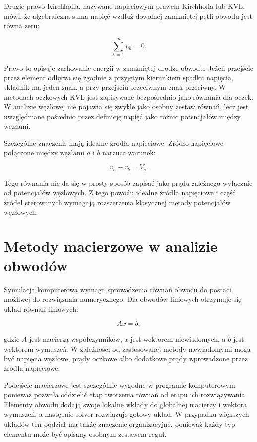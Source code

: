 Drugie prawo Kirchhoffa, nazywane napięciowym prawem Kirchhoffa lub KVL, mówi, że algebraiczna suma napięć wzdłuż dowolnej zamkniętej pętli obwodu jest równa zeru:

\begin{equation}
\label{eq:kvl}
\sum_{k=1}^{m} u_k = 0.
\end{equation}

Prawo to opisuje zachowanie energii w zamkniętej drodze obwodu. Jeżeli przejście przez element odbywa się zgodnie z przyjętym kierunkiem spadku napięcia, składnik ma jeden znak, a przy przejściu przeciwnym znak przeciwny. W metodach oczkowych KVL jest zapisywane bezpośrednio jako równania dla oczek. W analizie węzłowej nie pojawia się zwykle jako osobny zestaw równań, lecz jest uwzględniane pośrednio przez definicję napięć jako różnic potencjałów między węzłami.

Szczególne znaczenie mają idealne źródła napięciowe. Źródło napięciowe połączone między węzłami \(a\) i \(b\) narzuca warunek:

\begin{equation}
\label{eq:voltage-source}
v_a - v_b = V_s.
\end{equation}

Tego równania nie da się w prosty sposób zapisać jako prądu zależnego wyłącznie od potencjałów węzłowych. Z tego powodu idealne źródła napięciowe i część źródeł sterowanych wymagają rozszerzenia klasycznej metody potencjałów węzłowych.

\section{Metody macierzowe w analizie obwodów}
\label{sec:metody-macierzowe}

Symulacja komputerowa wymaga sprowadzenia równań obwodu do postaci możliwej do rozwiązania numerycznego. Dla obwodów liniowych otrzymuje się układ równań liniowych:

\begin{equation}
\label{eq:linear-system}
A x = b,
\end{equation}

gdzie \(A\) jest macierzą współczynników, \(x\) jest wektorem niewiadomych, a \(b\) jest wektorem wymuszeń. W zależności od zastosowanej metody niewiadomymi mogą być napięcia węzłowe, prądy oczkowe albo dodatkowe prądy wprowadzone przez źródła napięciowe.

Podejście macierzowe jest szczególnie wygodne w programie komputerowym, ponieważ pozwala oddzielić etap tworzenia równań od etapu ich rozwiązywania. Elementy obwodu dodają swoje lokalne wkłady do globalnej macierzy i wektora wymuszeń, a następnie solver rozwiązuje gotowy układ. W przypadku większych układów ten podział ma także znaczenie organizacyjne, ponieważ każdy typ elementu może być opisany osobnym zestawem reguł.

